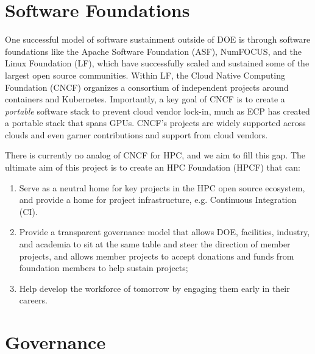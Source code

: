 \documentclass[11pt]{article}
\begin{document}

\section{Software Foundations}

One successful model of software sustainment outside of DOE is through software
foundations like the Apache Software Foundation (ASF), NumFOCUS, and the Linux
Foundation (LF), which have successfully scaled and sustained some of the largest open
source communities. Within LF, the Cloud Native Computing Foundation (CNCF) organizes a
consortium of independent projects around containers and Kubernetes. Importantly, a key
goal of CNCF is to create a {\it portable} software stack to prevent cloud vendor
lock-in, much as ECP has created a portable stack that spans GPUs. CNCF's projects are
widely supported across clouds and even garner contributions and support from cloud
vendors.

There is currently no analog of CNCF for HPC, and we aim to fill this gap. The ultimate
aim of this project is to create an HPC Foundation (HPCF) that can:
\begin{enumerate}
\item Serve as a neutral home for key projects in the HPC open source ecosystem, and
      provide a home for project infrastructure, e.g. Continuous Integration (CI).
\item Provide a transparent governance model that allows DOE, facilities, industry, and
      academia to sit at the same table and steer the direction of member projects, and
      allows member projects to accept donations and funds from foundation members to
      help sustain projects;
\item Help develop the workforce of tomorrow by engaging them early in their careers. 
\end{enumerate}

\section{Governance}
\end{document}
